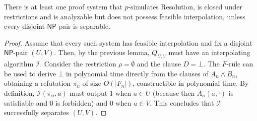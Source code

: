 \begin{theorem}
    \label{thm:an_no_fis_int}
    There is at least one proof system that $p$-simulates Resolution, is closed under restrictions and is analyzable but does not possess feasible interpolation, unless every disjoint $\mathsf{NP}$-pair is separable.
\end{theorem}

\begin{proof}
    Assume that every such system has feasible interpolation and fix a disjoint $\mathsf{NP}$-pair $(U,V)$. Then, by the previous lemma, $Q_{U,V}$ must have an interpolating algorithm $\mathcal{I}$. Consider the restriction $\rho=\emptyset$ and the clause $D=\bot$. The $F$-rule can be used to derive $\bot$ in polynomial time directly from the clauses of $A_n \land B_n$, obtaining a refutation $\pi_n$ of size $O(|F_n|)$, constructible in polynomial time. By definition, $\mathcal{I}(\pi_n,a)$ must output $1$ when $a\in U$ (because then $A_n(a,\cdot)$ is satisfiable and $0$ is forbidden) and $0$ when $a\in V$. This concludes that $\mathcal{I}$ successfully separates $(U,V)$.
\end{proof}

